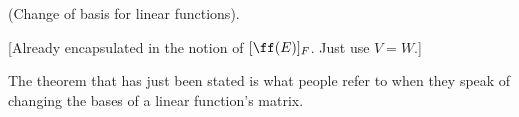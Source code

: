 \begin{comment}
    \begin{theorem}
        (Change of basis for linear functions). 
        
        Let $V$ and $W$ be finite-dimensional vector spaces. Let $E, G$ be bases of $V$, let $F, H$ be bases of $W$, and consider a linear function $\ff:V \rightarrow W$. Then $\ff_{E,F}$ and $\ff_{G,H}$ are related by
        
        \begin{align*}
            \ff_{G,H} = [\cdot]_H \circ [\cdot]_{F^{-1}} \circ \ff_{E,F} \circ [\cdot]_E \circ [\cdot]_{G^{-1}}.
        \end{align*}
        
        This is because $\ff_{E,F}$ was defined as $\ff_{E,F} := [\cdot]_F \circ \ff \circ [\cdot]_E^{-1}$. (See Theorem \ref{ch::lin_alg::thm::f_EF}). But $[\cdot]_H \circ [\cdot]_{F^{-1}} = (\II_W)_{F,H}$ and $[\cdot]_E \circ [\cdot]_{G^{-1}} = (\II_V)_{G,F}$, so
        
        \begin{align*}
            \ff_{G,H} = (\II_W)_{F, H} \circ \ff_{E,F} \circ (\II_V)_{G,F}.
        \end{align*}
        
        We now translate the above equation into a statement about primitive matrices. Since the primitive matrix of a composition of functions is the product of matrices taken relative to the appropriate bases (see Theorem \ref{ch::lin_alg::thm::matrix_matrix_product_relative_to_bases}), we have
    
        \begin{align*}
            [\ff(G)]_H = [\II_W(F)]_H [\ff(E)]_F [\II_V(G)]_F = [\FF]_H [\ff(E)]_F [\GG]_F = [\FF]_H [\ff(E)]_F [\FF]_G^{-1}.
        \end{align*}
        
        The last equality follows from the previous theorem.
        
    \end{theorem}
\end{comment}

\begin{theorem}
\label{thm::lin_alg::thm::change_of_bases_fns_common_special_case}
    (Change of basis for linear functions).

    [Already encapsulated in the notion of $[\ff(E)]_F$. Just use $V = W$.]
    
    The theorem that has just been stated is what people refer to when they speak of changing the bases of a linear function's matrix.
\end{theorem}

